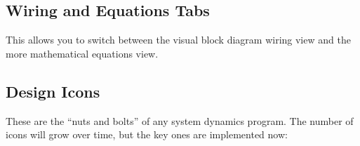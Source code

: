 \subsection{Wiring and Equations Tabs}
\label{WiringEquationsTab}


This allows you to switch between the visual block diagram wiring view and the more 
mathematical equations view.

\subsection{Design Icons}


These are the ``nuts and bolts'' of any system dynamics program. The
number of icons will grow over time, but the key ones are implemented
now: 

